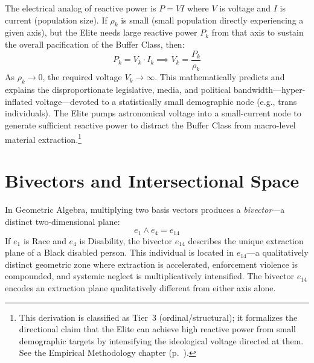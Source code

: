 \begin{keyinsight}
The electrical analog of reactive power is $P = VI$ where $V$ is voltage and $I$ is current (population size). If $\rho_k$ is small (small population directly experiencing a given axis), but the Elite needs large reactive power $P_k$ from that axis to sustain the overall pacification of the Buffer Class, then:
\begin{equation}\label{eq:ga.transphobia-paradox}
P_k = V_k \cdot I_k \implies V_k = \frac{P_k}{\rho_k}
\end{equation}
As $\rho_k \to 0$, the required voltage $V_k \to \infty$. This mathematically predicts and explains the disproportionate legislative, media, and political bandwidth---hyper-inflated voltage---devoted to a statistically small demographic node (e.g., trans individuals). The Elite pumps astronomical voltage into a small-current node to generate sufficient reactive power to distract the Buffer Class from macro-level material extraction.\footnote{This derivation is classified as Tier~3 (ordinal/structural); it formalizes the directional claim that the Elite can achieve high reactive power from small demographic targets by intensifying the ideological voltage directed at them. See the Empirical Methodology chapter (p.~\pageref{ch:empirical_methodology}).}
\end{keyinsight}

\section{Bivectors and Intersectional Space}

In Geometric Algebra, multiplying two basis vectors produces a \emph{bivector}---a distinct two-dimensional plane:
\begin{equation}\label{eq:ga.bivector}
e_1 \wedge e_4 = e_{14}
\end{equation}
If $e_1$ is Race and $e_4$ is Disability, the bivector $e_{14}$ describes the unique extraction plane of a Black disabled person. This individual is located in $e_{14}$---a qualitatively distinct geometric zone where extraction is accelerated, enforcement violence is compounded, and systemic neglect is multiplicatively intensified. The bivector $e_{14}$ encodes an extraction plane qualitatively different from either axis alone.

